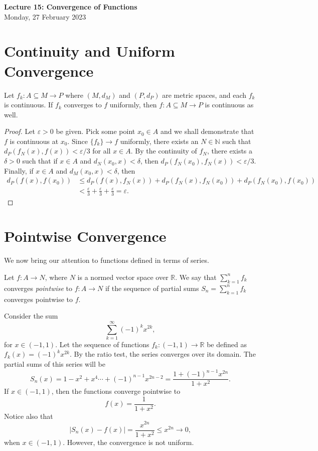 \documentclass[11pt]{article}
\theoremstyle{definition}
\newcommand{\R}{\mathbb{R}}                      %
\newcommand{\N}{\mathbb{N}}
\begin{document}
\thispagestyle{empty}

\begin{center}
{\LARGE \bf Lecture 15: Convergence of Functions}\\
{\large Monday, 27 February 2023}\\
\end{center}

\section{Continuity and Uniform Convergence}
\prop Let $f_k:A\subseteq M\to P$ where $(M,d_M)$ and $(P,d_P)$ are metric spaces, and each $f_k$ is continuous. If $f_k$ converges to $f$ uniformly, then $f:A\subseteq M\to P$ is continuous as well.
\begin{proof}
    Let $\varepsilon>0$ be given. Pick some point $x_0\in A$ and we shall demonstrate that $f$ is continuous at $x_0$. Since $\{f_k\}\to f$ uniformly, there exists an $N\in \N$ such that $d_P(f_N(x),f(x))<\varepsilon/3$ for all $x\in A$. By the continuity of $f_N$, there exists a $\delta>0$ such that if $x\in A$ and $d_N(x_0,x)<\delta$, then $d_P(f_N(x_0),f_N(x))<\varepsilon/3$. Finally, if $x\in A$ and $d_M(x_0,x)<\delta$, then
    \begin{align*}
        d_P(f(x),f(x_0))&\leq d_P(f(x),f_N(x))+d_P(f_N(x),f_N(x_0))+d_P(f_N(x_0),f(x_0))\\
        &<\frac{\varepsilon}{3}+\frac{\varepsilon}{3}+\frac{\varepsilon}{3}=\varepsilon.
    \end{align*}
\end{proof}
\section{Pointwise Convergence}
We now bring our attention to functions defined in terms of series. 

\begin{mdframed}[backgroundcolor = blue!10]
\vspace{+0.2cm}
 Let $f:A\to N$, where $N$ is a normed vector space over $\R$. We say that $\sum_{k=1}^n f_k$ converges \textit{pointwise} to $f:A\to N$ if the sequence of partial sums $S_n=\sum_{k=1}^{n}f_k$ converges pointwise to $f$.
\end{mdframed}

\ex Consider the sum
$$
\sum_{k=1}^\infty (-1)^kx^{2k},
$$
for $x\in(-1,1)$. Let the sequence of functions $f_k:(-1,1)\to \R$ be defined as $f_k(x)=(-1)^k x^{2k}$. By the ratio test, the series converges over its domain. The partial sums of this series will be
$$
S_n(x)=1-x^2+x^4\cdots+(-1)^{n-1}x^{2n-2}=\frac{1+(-1)^{n-1}x^{2n}}{1+x^2}.
$$
If $x\in(-1,1)$, then the functions converge pointwise to 
$$
f(x)=\frac{1}{1+x^2}.
$$
Notice also that 
$$
|S_n(x)-f(x)|=\frac{x^{2n}}{1+x^2}\leq x^{2n}\to 0,
$$
when $x\in(-1,1)$. However, the convergence is not uniform.
\end{document}
